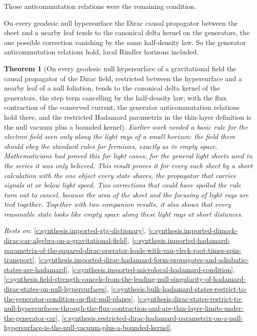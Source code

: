 \documentclass[11pt]{article}
\newtheorem{theorem}{Theorem}[section]
\theoremstyle{definition}
\theoremstyle{plain}
\begin{document}
Those anticommutation relations were the remaining condition.

On every geodesic null hypersurface the Dirac causal propagator between the sheet and a nearby leaf tends to the canonical delta kernel on the generators, the one possible correction vanishing by the same half-density law. So the generator anticommutation relations hold, local Rindler horizons included.

\begin{theorem}[On every geodesic null hypersurface of a gravitational field the causal propagator of the Dirac field, restricted between the hypersurface and a nearby leaf of a null foliation, tends to the canonical delta kernel of the generators, the step term cancelling by the half-density law; with the flux contraction of the conserved current, the generator anticommutation relations hold there, and the restricted Hadamard parametrix in the thin-layer definition is the null vacuum plus a bounded kernel]\label{c:synthesis.dirac-causal-propagator-between-nearby-null-leaves-tends-to-the-generator-car-on-every-geodesic-null-hypersurface}
Earlier work needed a basic rule for the electron field seen only along the light rays of a small horizon: the field there should obey the standard rules for fermions, exactly as in empty space. Mathematicians had proved this for light cones; for the general light sheets used in the series it was only believed. This result proves it for every such sheet by a short calculation with the one object every state shares, the propagator that carries signals at or below light speed. Two corrections that could have spoiled the rule turn out to cancel, because the area of the sheet and the focusing of light rays are tied together. Together with two companion results, it also shows that every reasonable state looks like empty space along these light rays at short distances.
\end{theorem}
\noindent\emph{Rests on:} \ref{c:synthesis.imported-gtg-dictionary}, \ref{c:synthesis.imported-dimock-dirac-car-algebra-on-a-gravitational-field}, \ref{c:synthesis.imported-hadamard-parametrix-of-the-squared-dirac-operator-leads-with-van-vleck-root-times-spin-transport}, \ref{c:synthesis.imported-dirac-hadamard-form-propagates-and-adiabatic-states-are-hadamard}, \ref{c:synthesis.imported-microlocal-hadamard-condition}, \ref{c:synthesis.field-strength-cancels-from-the-leading-null-singularity-of-hadamard-dirac-states-on-null-hypersurfaces}, \ref{c:synthesis.bulk-hadamard-states-restrict-to-the-generator-condition-on-flat-null-planes}, \ref{c:synthesis.dirac-states-restrict-to-null-hypersurfaces-through-the-flux-contraction-and-are-thin-layer-limits-under-the-generator-car}, \ref{c:synthesis.restricted-dirac-hadamard-parametrix-on-a-null-hypersurface-is-the-null-vacuum-plus-a-bounded-kernel}.
\end{document}
